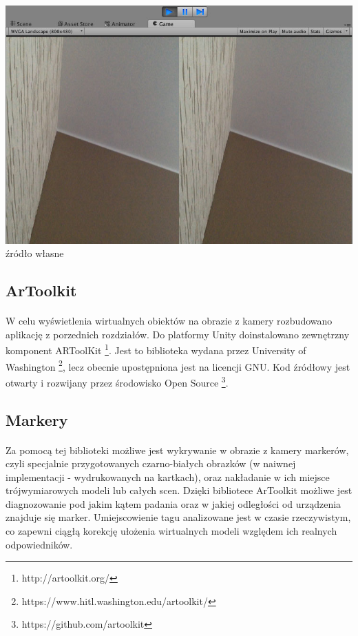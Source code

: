 \begin{center}
\includegraphics[width=1\textwidth]{images/kadr.jpg}
\small {źródło własne}
\end{center}

\subsection{ArToolkit}
\paragraph{}
W celu wyświetlenia wirtualnych obiektów na obrazie z kamery rozbudowano aplikację z porzednich rozdziałów. Do platformy Unity doinstalowano zewnętrzny komponent ARToolKit  \footnote{http://artoolkit.org/}. Jest to biblioteka wydana przez University of Washington \footnote{https://www.hitl.washington.edu/artoolkit/}, lecz obecnie upostępniona jest na licencji GNU. Kod źródłowy jest otwarty i rozwijany przez środowisko Open Source \footnote{https://github.com/artoolkit}.
\subsection{Markery}
\paragraph{}
Za pomocą tej biblioteki możliwe jest wykrywanie w obrazie z kamery markerów, czyli specjalnie przygotowanych czarno-białych obrazków (w naiwnej implementacji - wydrukowanych na kartkach), oraz nakładanie w ich miejsce trójwymiarowych modeli lub całych scen. Dzięki bibliotece ArToolkit możliwe jest diagnozowanie pod jakim kątem padania oraz w jakiej odległości od urządzenia znajduje się marker. Umiejscowienie tagu analizowane jest w czasie rzeczywistym, co zapewni ciągłą korekcję ułożenia wirtualnych modeli względem ich realnych odpowiedników.

